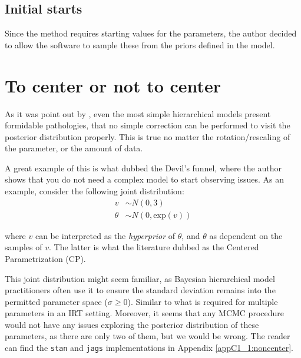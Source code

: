 
\subsection{Initial starts}

Since the method requires starting values for the parameters, the author decided to allow the software to sample these from the priors defined in the model.



\section{To center or not to center} \label{sect:noncenter}

As it was point out by \citet{Betancourt_et_al_2013}, even the most simple hierarchical models present formidable pathologies, that no simple correction can be performed to visit the posterior distribution properly. This is true no matter the rotation/rescaling of the parameter, or the amount of data. 

A great example of this is what \citet{McElreath_2020} dubbed the Devil's funnel, where the author shows that you do not need a complex model to start observing issues. As an example, consider the following joint distribution:
%
\begin{equation} \label{eq:devil}
	\begin{split}	
		v &\sim N(0, 3) \\
		\theta &\sim N(0, \text{exp}(v))
	\end{split}
\end{equation}

\noindent where $v$ can be interpreted as the \textit{hyperprior} of $\theta$, and $\theta$ as dependent on the samples of $v$. The latter is what the literature dubbed as the Centered Parametrization (CP).

This joint distribution might seem familiar, as Bayesian hierarchical model practitioners often use it to ensure the standard deviation remains into the permitted parameter space ($\sigma \geq 0$). Similar to what is required for multiple parameters in an IRT setting. Moreover, it seems that any MCMC procedure would not have any issues exploring the posterior distribution of these parameters, as there are only two of them, but we would be wrong. The reader can find the \texttt{stan} and \texttt{jags} implementations in Appendix \ref{appC1_1:noncenter}.

